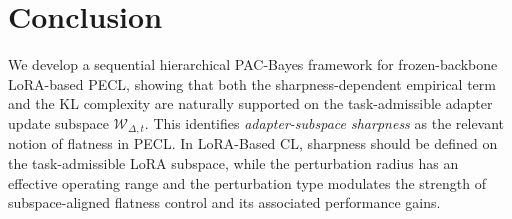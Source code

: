 \documentclass{article}
\theoremstyle{plain}
\theoremstyle{definition}
\theoremstyle{remark}
\begin{document}







\section{Conclusion}

We develop a sequential hierarchical PAC-Bayes framework for frozen-backbone LoRA-based PECL, showing that both the sharpness-dependent empirical term and the KL complexity are naturally supported on the task-admissible adapter update subspace $\mathcal W_{\Delta,t}$. This identifies \emph{adapter-subspace sharpness} as the relevant notion of flatness in PECL.
In LoRA-Based CL, sharpness should be defined on the task-admissible LoRA subspace, while the perturbation radius has an effective operating range and the perturbation type modulates the strength of subspace-aligned flatness control and its associated performance gains.

\end{document}
